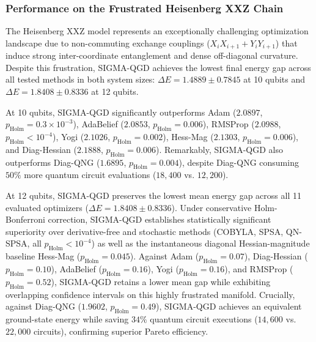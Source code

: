 \documentclass[11pt,a4paper]{article}
\begin{document}
\subsubsection{Performance on the Frustrated Heisenberg XXZ Chain}
The Heisenberg XXZ model represents an exceptionally challenging optimization landscape due to non-commuting exchange couplings ($X_i X_{i+1} + Y_i Y_{i+1}$) that induce strong inter-coordinate entanglement and dense off-diagonal curvature. Despite this frustration, SIGMA-QGD achieves the lowest final energy gap across all tested methods in both system sizes: $\Delta E = 1.4889 \pm 0.7845$ at 10 qubits and $\Delta E = 1.8408 \pm 0.8336$ at 12 qubits.

At 10 qubits, SIGMA-QGD significantly outperforms Adam ($2.0897$, $p_{\text{Holm}} = 0.3 \times 10^{-3}$), AdaBelief ($2.0853$, $p_{\text{Holm}} = 0.006$), RMSProp ($2.0988$, $p_{\text{Holm}} < 10^{-4}$), Yogi ($2.1026$, $p_{\text{Holm}} = 0.002$), Hess-Mag ($2.1303$, $p_{\text{Holm}} = 0.006$), and Diag-Hessian ($2.1888$, $p_{\text{Holm}} = 0.006$). Remarkably, SIGMA-QGD also outperforms Diag-QNG ($1.6895$, $p_{\text{Holm}} = 0.004$), despite Diag-QNG consuming $50\%$ more quantum circuit evaluations ($18,400$ vs. $12,200$). 

At 12 qubits, SIGMA-QGD preserves the lowest mean energy gap across all 11 evaluated optimizers ($\Delta E = 1.8408 \pm 0.8336$). Under conservative Holm-Bonferroni correction, SIGMA-QGD establishes statistically significant superiority over derivative-free and stochastic methods (COBYLA, SPSA, QN-SPSA, all $p_{\text{Holm}} < 10^{-4}$) as well as the instantaneous diagonal Hessian-magnitude baseline Hess-Mag ($p_{\text{Holm}} = 0.045$). Against Adam ($p_{\text{Holm}} = 0.07$), Diag-Hessian ($p_{\text{Holm}} = 0.10$), AdaBelief ($p_{\text{Holm}} = 0.16$), Yogi ($p_{\text{Holm}} = 0.16$), and RMSProp ($p_{\text{Holm}} = 0.52$), SIGMA-QGD retains a lower mean gap while exhibiting overlapping confidence intervals on this highly frustrated manifold. Crucially, against Diag-QNG ($1.9602$, $p_{\text{Holm}} = 0.49$), SIGMA-QGD achieves an equivalent ground-state energy while saving $34\%$ quantum circuit executions ($14,600$ vs. $22,000$ circuits), confirming superior Pareto efficiency.
\end{document}
